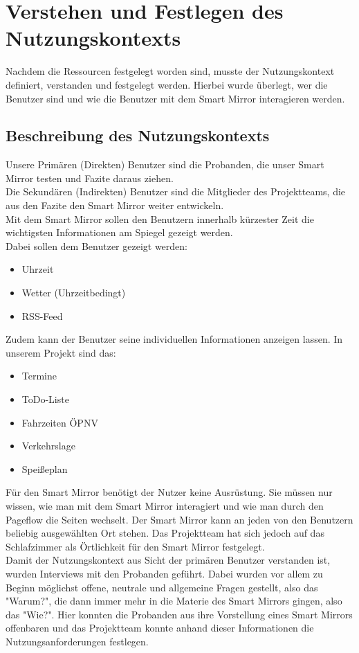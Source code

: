 \documentclass[12pt, a4paper]{scrartcl}
\begin{document}
	\newpage
	
	\section{Verstehen und Festlegen des Nutzungskontexts}
	Nachdem die Ressourcen festgelegt worden sind, musste der Nutzungskontext definiert, verstanden und festgelegt werden. Hierbei wurde überlegt, wer die Benutzer sind und wie die Benutzer mit dem Smart Mirror interagieren werden.
	\subsection{Beschreibung des Nutzungskontexts}
	Unsere Primären (Direkten) Benutzer sind die Probanden, die unser Smart Mirror testen und Fazite daraus ziehen.\\
	Die Sekundären (Indirekten) Benutzer sind die Mitglieder des Projektteams, die aus den Fazite den Smart Mirror weiter entwickeln.\\
	Mit dem Smart Mirror sollen den Benutzern innerhalb kürzester Zeit die wichtigsten Informationen am Spiegel gezeigt werden.\\
	Dabei sollen dem Benutzer gezeigt werden:
	\begin{itemize}
		\setlength\itemsep{-0.5em}
		\item Uhrzeit
		\item Wetter (Uhrzeitbedingt)
		\item RSS-Feed
	\end{itemize}
	Zudem kann der Benutzer seine individuellen Informationen anzeigen lassen. In unserem Projekt sind das:
	\begin{itemize}
		\setlength\itemsep{-0.5em}
		\item Termine
		\item  ToDo-Liste
		\item Fahrzeiten ÖPNV
		\item Verkehrslage
		\item Speißeplan
	\end{itemize}
	Für den Smart Mirror benötigt der Nutzer keine Ausrüstung. Sie müssen nur wissen, wie man mit dem Smart Mirror interagiert und wie man durch den Pageflow die Seiten wechselt. Der Smart Mirror kann an jeden von den Benutzern beliebig ausgewählten Ort stehen. Das Projektteam hat sich jedoch auf das Schlafzimmer als Örtlichkeit für den Smart Mirror festgelegt.\\
	
	Damit der Nutzungskontext aus Sicht der primären Benutzer verstanden ist, wurden Interviews mit den Probanden geführt.
	Dabei wurden vor allem zu Beginn möglichst offene, neutrale und allgemeine Fragen gestellt, also das "Warum?", die dann immer mehr in die Materie des Smart Mirrors gingen, also das "Wie?". Hier konnten die Probanden aus ihre Vorstellung eines Smart Mirrors offenbaren und das Projektteam konnte anhand dieser Informationen die Nutzungsanforderungen festlegen. 
	
\end{document}
